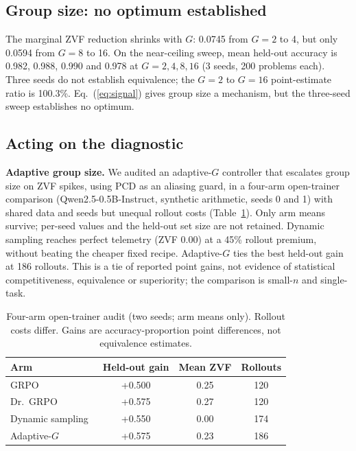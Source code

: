 \subsection{Group size: no optimum established}
The marginal ZVF reduction shrinks with $G$: 0.0745 from $G=2$ to 4, but
only 0.0594 from $G=8$ to 16. On the near-ceiling sweep, mean held-out
accuracy is 0.982, 0.988, 0.990 and 0.978 at $G=2,4,8,16$ (3 seeds,
200 problems each). Three seeds do not establish equivalence; the $G=2$ to
$G=16$ point-estimate ratio is 100.3\%. Eq.~(\ref{eq:signal})
gives group size a mechanism, but the three-seed sweep establishes no
optimum.

\subsection{Acting on the diagnostic}
\textbf{Adaptive group size.} We audited an adaptive-$G$ controller that
escalates group size on ZVF spikes, using PCD as an aliasing guard, in a
four-arm open-trainer comparison (Qwen2.5-0.5B-Instruct, synthetic
arithmetic, seeds 0 and 1) with shared data and seeds but unequal rollout
costs (Table~\ref{tab:arms}). Only arm means survive; per-seed values and
the held-out set size are not retained. Dynamic sampling reaches perfect telemetry
(ZVF 0.00) at a 45\% rollout premium, without beating the cheaper fixed
recipe. Adaptive-$G$ ties the best held-out gain at 186 rollouts.
This is a tie of reported point gains, not evidence of statistical
competitiveness, equivalence or superiority; the comparison is small-$n$
and single-task.

\begin{table}[t]
\caption{Four-arm open-trainer audit (two seeds; arm means only). Rollout costs differ. Gains are accuracy-proportion point differences, not equivalence estimates.}
\label{tab:arms}
\centering
\small
\setlength{\tabcolsep}{4pt}\begin{tabular}{@{}lccc@{}}
\toprule
Arm & Held-out gain & Mean ZVF & Rollouts \\
\midrule
GRPO & +0.500 & 0.25 & 120 \\
Dr.\ GRPO~\cite{liu2025understanding} & +0.575 & 0.27 & 120 \\
Dynamic sampling~\cite{yu2025dapo} & +0.550 & 0.00 & 174 \\
Adaptive-$G$ & +0.575 & 0.23 & 186 \\
\bottomrule
\end{tabular}
\end{table}


